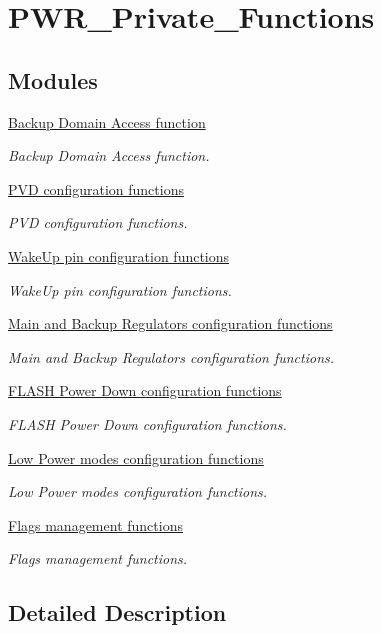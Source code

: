 \hypertarget{group___p_w_r___private___functions}{\section{P\-W\-R\-\_\-\-Private\-\_\-\-Functions}
\label{group___p_w_r___private___functions}
}
\subsection*{Modules}
\begin{DoxyCompactItemize}
\item 
\hyperlink{group___p_w_r___group1}{Backup Domain Access function}
\begin{DoxyCompactList}\small\item\em Backup Domain Access function. \end{DoxyCompactList}\item 
\hyperlink{group___p_w_r___group2}{P\-V\-D configuration functions}
\begin{DoxyCompactList}\small\item\em P\-V\-D configuration functions. \end{DoxyCompactList}\item 
\hyperlink{group___p_w_r___group3}{Wake\-Up pin configuration functions}
\begin{DoxyCompactList}\small\item\em Wake\-Up pin configuration functions. \end{DoxyCompactList}\item 
\hyperlink{group___p_w_r___group4}{Main and Backup Regulators configuration functions}
\begin{DoxyCompactList}\small\item\em Main and Backup Regulators configuration functions. \end{DoxyCompactList}\item 
\hyperlink{group___p_w_r___group5}{F\-L\-A\-S\-H Power Down configuration functions}
\begin{DoxyCompactList}\small\item\em F\-L\-A\-S\-H Power Down configuration functions. \end{DoxyCompactList}\item 
\hyperlink{group___p_w_r___group6}{Low Power modes configuration functions}
\begin{DoxyCompactList}\small\item\em Low Power modes configuration functions. \end{DoxyCompactList}\item 
\hyperlink{group___p_w_r___group7}{Flags management functions}
\begin{DoxyCompactList}\small\item\em Flags management functions. \end{DoxyCompactList}\end{DoxyCompactItemize}


\subsection{Detailed Description}
